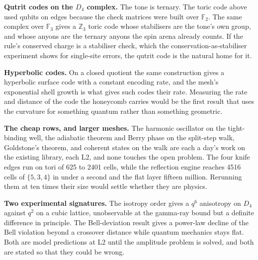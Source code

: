 \textbf{Qutrit codes on the $D_4$ complex.} The tone is ternary. The toric code above used qubits on edges because
the check matrices were built over $\mathbb{F}_2$. The same complex over $\mathbb{F}_3$ gives a $\mathbb{Z}_3$ toric
code whose stabilisers are the tone's own group, and whose anyons are the ternary anyons the spin arena already
counts. If the rule's conserved charge is a stabiliser check, which the conservation-as-stabiliser experiment shows
for single-site errors, the qutrit code is the natural home for it.

\textbf{Hyperbolic codes.} On a closed quotient the same construction gives a hyperbolic surface code
\cite{breuckmann2016} with a constant encoding rate, and the mesh's exponential shell growth is what gives such codes
their rate. Measuring the rate and distance of the code the honeycomb carries would be the first result that uses
the curvature for something quantum rather than something geometric.

\textbf{The cheap rows, and larger meshes.} The harmonic oscillator on the tight-binding well, the adiabatic theorem
and Berry phase on the split-step walk, Goldstone's theorem, and coherent states on the walk are each a day's work on
the existing library, each L2, and none touches the open problem. The four knife edges run on tori of 625 to 2401
cells, while the reflection engine reaches 4516 cells of $\{5,3,4\}$ in under a second and the flat layer fifteen
million. Rerunning them at ten times their size would settle whether they are physics.

\textbf{Two experimental signatures.} The isotropy order gives a $q^6$ anisotropy on $D_4$ against $q^2$ on a cubic
lattice, unobservable at the gamma-ray bound but a definite difference in principle. The Bell-deviation result gives
a power-law decline of the Bell violation beyond a crossover distance while quantum mechanics stays flat. Both are
model predictions at L2 until the amplitude problem is solved, and both are stated so that they could be wrong.
